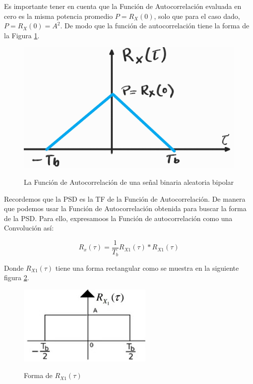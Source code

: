 Es importante tener en cuenta que la Función de Autocorrelación evaluada en cero es la misma potencia promedio $P=R_{X}(0)$, solo que para el caso dado, $P=R_{X}(0)=A^2$. De modo que la función de autocorrelación tiene la forma de la Figura \ref{fig:Triangulo}.

\begin{figure}[h!]
	\captionsetup{justification = raggedright, singlelinecheck = false}
	\caption{La Función de Autocorrelación de una señal binaria aleatoria bipolar} 
	\centering
	\includegraphics[scale=0.3]{Imagenes/Triangulo.png}
	\label{fig:Triangulo}
\end{figure}

Recordemos que la PSD es la TF de la Función de Autocorrelación. De manera que podemos usar la Función de Autocorrelación obtenida para buscar la forma de la PSD. Para ello, expresamoos la Función de autocorrelación como una Convolución así:

\begin{equation} \label{equ_treintacinco}
	 R_{x}(\tau) =\frac{1}{T_{b}} R_{X1}(\tau) * R_{X1}(\tau) 
\end{equation}

Donde $R_{X1}(\tau)$ tiene una forma rectangular como se muestra en la siguiente figura \ref{fig:Cuadrado}.



\begin{figure}[h!]
	\captionsetup{justification = raggedright, singlelinecheck = false}
	\caption{ Forma de $R_{X1}(\tau)$} 
	\centering
	\includegraphics[scale=1]{Imagenes/Cuadrado.png}
	\label{fig:Cuadrado}
\end{figure}

